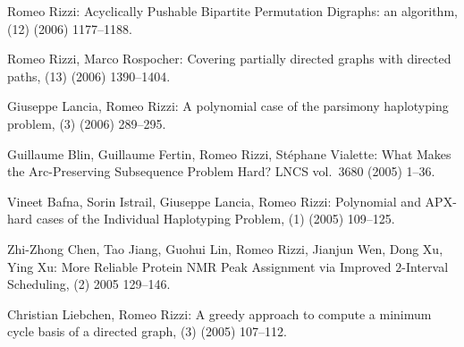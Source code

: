 \begin{etaremune}
  \item {\sc Romeo Rizzi:}
   \newblock  Acyclically Pushable Bipartite Permutation Digraphs: an algorithm,
   (12) (2006) 1177--1188.

  \item {\sc Romeo Rizzi, Marco Rospocher:}
   \newblock  Covering partially directed graphs with directed paths,
   (13) (2006) 1390--1404.

  \item {\sc Giuseppe Lancia, Romeo Rizzi:}
   \newblock  A polynomial case of the parsimony haplotyping problem,
   (3) (2006) 289--295.

  \item {\sc Guillaume Blin, Guillaume Fertin, Romeo Rizzi,
                  St\'ephane Vialette:}
   \newblock What Makes the Arc-Preserving Subsequence Problem Hard?
   \newblock  LNCS vol.~3680 (2005) 1--36.

  \item {\sc Vineet Bafna, Sorin Istrail, Giuseppe Lancia, Romeo Rizzi:}
   \newblock  Polynomial and APX-hard cases of the Individual Haplotyping Problem,
   (1) (2005) 109--125.

  \item {\sc Zhi-Zhong Chen, Tao Jiang, Guohui Lin, Romeo Rizzi,
                  Jianjun Wen, Dong Xu, Ying Xu:}
   \newblock  More Reliable Protein NMR Peak Assignment via Improved $2$-Interval Scheduling,
   (2) 2005 129--146.

  \item {\sc Christian Liebchen, Romeo Rizzi:}
   \newblock  A greedy approach to compute a minimum cycle basis
              of a directed graph,
   (3) (2005) 107--112.


\end{etaremune}
